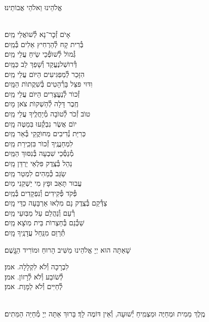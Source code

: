 \documentclass[twoside, openany, parskip=half, 11pt]{book}
\begin{document}
\begin{small}אֱלֹהֵינוּ וֵאלֹהֵי אֲבוֹתֵינוּ׃\end{small}\\
אָיׂם זְ֯כׇר־נָא לְ֯שׁוׂאֲלֵי \hfill מַֽיִם׃\\
בְּ֯רִית קָח לְ֯הַרְחִיץ אֵלִים \hfill בְּ֯מַֽיִם׃\\
גְּ֯מוׂל לְ֯שׁוׂפְ֯כֵי שִֹֽיחַ עֲלֵי \hfill מַֽיִם׃\\
דְּ֯רוׂשְׁלנֶעֱקַד וְ֯שָׁפַךְ לֵב \hfill כַּמָּֽיִם׃\\
הִזָּכֵר לְ֯מַפְגִּיעִים הַיּוׂם עֲלֵי \hfill מַֽיִם׃\\
וִדּוּי פּצֵּל בָּרְ֯הָטִים בְּ֯שִׁקֲתוׂת \hfill הַמָּֽיִם׃\\
זְ֯כוׂר לְ֯נֶעֱצָרִים הַיּוׂם עֲלֵי \hfill מַֽיִם׃\\
חֶֽבֶר דָּלָה לְ֯הַשְׁקוׂת צׂאן \hfill מָיִם׃\\
טוׂב זְ֯כׂר לְ֯טוׂבָה מְ֯יַחֲלֶֽיךָ עֲלֵי \hfill מַֽיִם׃\\
יוׂם אֲשֶׂר נִבְקְ֯עוּ בּֽמַטֶּה \hfill מָֽיִם׃\\
כּֽרִיַּת נְ֯דִיבִים מֽחוׂקֲקֵי בְּ֯אֵר \hfill מַֽיִם׃\\
לִמְחַנֲנֶֽיךָ זְ֯כוׂר בִּזְכִֽירַת \hfill מַֽיִם׃\\
מְ֯נַסְּ֯כֵי שִׁבְעָה בְּ֯נִסּוּךְ \hfill הַמַּֽיִם׃\\
נַהֵל בְּ֯צֶֽדֶק פִּלְאֵי יַרְדֵּן \hfill מָֽיִם׃\\
שַֹגֵּב כְּ֯מֵהִים לִמְטַר \hfill מַֽיִם׃\\
עֲבוּר תָּאַב וּפָץ מִי יַשְׁקֵנִי \hfill מַיִם׃\\
פְּ֯קׂד פְּ֯קִידִים וְ֯נִפְקָדִים \hfill בְּ֯מַֽיִם׃\\
צַדְּ֯קֵם בְּ֯צֶֽדֶק נָם מִלְאוּ אַרְבָּעָה כַדֵּי \hfill מָֽיִם׃\\
רְ֯עֵם וְ֯נַהֲלֵם עַל מַבּֽוּעֵי \hfill מַֽיִם׃\\
שַׁכְּ֯נֵם בְּ֯חַצְרוׂת בֵּית מֽוׂצָא \hfill מַֽיִם׃\\
תְּ֯רַוֵּם מִנַּֽחַל עֲדָנֶֽיךָ \hfill מָֽיִם׃

שָׁאַתָּה הוּא יְיָ אֱלֹהֵינוּ מַשִּׁיב הָרוּחַ וּמוֹרִיד הַגֱּֽשֶׁם׃

לִבְרָכָה וְ֯לֹא לִקְלָלָה. \hfill אמן׃\\
לְ֯שׂוֹבַע וְ֯לֹא לְ֯רָזוֹן. \hfill אמן׃\\
לְ֯חַיִּים וְ֯לֹא לַמָּוֶת. \hfill אמן׃

\\
מֶֽלֶךְ מֵמִית וּמְחַיֶּה וּמַצְמִֽיחַ יְ֯שׁוּעָה, וְ֯אֵין דּוֹמֶה לָךְ׃ בָּרוּךְ אַתָּה יְיָ מְ֯חַיֵּה הַמֵּתִים׃
\end{document}
